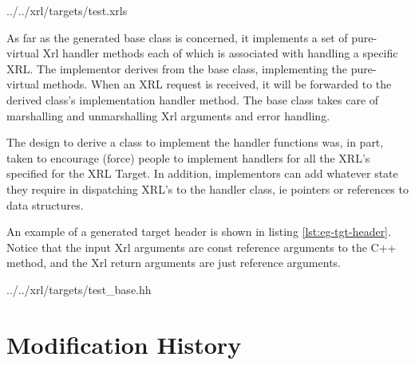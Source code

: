 \documentclass[11pt]{article}
\begin{document}
%
  {../../xrl/targets/test.xrls}

As far as the generated base class is concerned, it implements a set
of pure-virtual Xrl handler methods each of which is associated with
handling a specific XRL.  The implementor derives from the base class,
implementing the pure-virtual methods.  When an XRL request is
received, it will be forwarded to the derived class's implementation
handler method.  The base class takes care of marshalling and
unmarshalling Xrl arguments and error handling.

The design to derive a class to implement the handler functions was,
in part, taken to encourage (force) people to implement handlers for
all the XRL's specified for the XRL Target.  In addition, implementors
can add whatever state they require in dispatching XRL's to the
handler class, ie pointers or references to data structures.

An example of a generated target header is shown in listing
\ref{lst:eg-tgt-header}.  Notice that the input Xrl arguments are
const reference arguments to the C++ method, and the Xrl return
arguments are just reference arguments.

\newpage
%
                {../../xrl/targets/test_base.hh}

\appendix
\section{Modification History}
\end{document}
